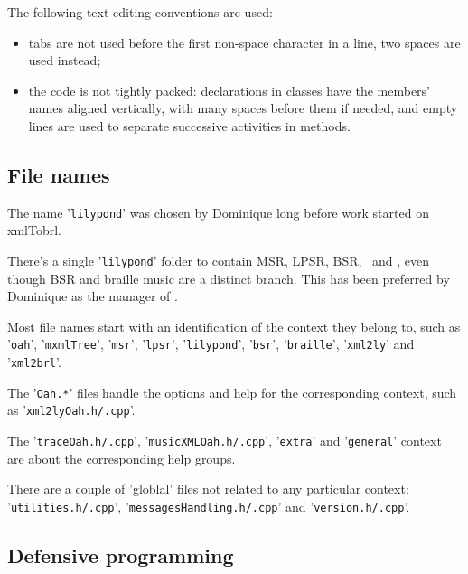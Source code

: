 \documentclass[12pt,a4paper]{article}
\begin{document}
The following text-editing conventions are used:
\begin{itemize}
\item tabs are not used before the first non-space character in a line, two spaces are used instead;

\item the code is not tightly packed: declarations in classes have the members' names aligned vertically, with many spaces before them if needed, and empty lines are used to separate successive activities in methods.
\end{itemize}

\subsection{File names}

The name '{\tt lilypond}' was chosen by Dominique long before work started on \\xmlTobrl.

There's a single '{\tt lilypond}' folder to contain MSR, LPSR, BSR, \xmlToLy\ and \xmlToBrl, even though BSR and braille music are a distinct branch. This has been preferred by Dominique as the manager of \lib.

Most file names start with an identification of the context they belong to, such as '{\tt oah}', '{\tt mxmlTree}', '{\tt msr}', '{\tt lpsr}', '{\tt lilypond}', '{\tt bsr}', '{\tt braille}', '{\tt xml2ly}' and '{\tt xml2brl}'.

The '{\tt *Oah.*}' files handle the options and help for the corresponding context, such as '{\tt xml2lyOah.h/.cpp}'.

The '{\tt traceOah.h/.cpp}', '{\tt musicXMLOah.h/.cpp}', '{\tt extra}' and '{\tt general}' context are about the corresponding help groups.

There are a couple of 'globlal' files not related to any particular context: '{\tt utilities.h/.cpp}', '{\tt messagesHandling.h/.cpp}' and '{\tt version.h/.cpp}'.


\subsection{Defensive programming}
\end{document}
